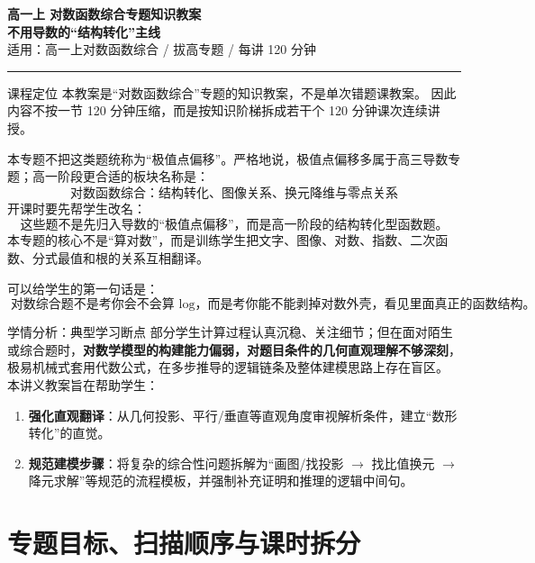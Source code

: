 \documentclass[11pt,a4paper]{ctexart}
\begin{document}
\begin{center}
  {\bfseries 高一上 \quad 对数函数综合专题知识教案}\\[3mm]
  {\Large \bfseries 不用导数的“结构转化”主线}\\[2mm]
  {\large 适用：高一上对数函数综合 / 拔高专题 / 每讲 120 分钟}\\[2mm]
  \rule{0.85\linewidth}{0.5pt}
\end{center}

\begin{teachbox}{课程定位}
本教案是“对数函数综合”专题的知识教案，不是单次错题课教案。
因此内容不按一节 120 分钟压缩，而是按知识阶梯拆成若干个 120 分钟课次连续讲授。

本专题不把这类题统称为“极值点偏移”。严格地说，极值点偏移多属于高三导数专题；高一阶段更合适的板块名称是：
\[
\boxed{\text{对数函数综合：结构转化、图像关系、换元降维与零点关系}}
\]
开课时要先帮学生改名：
\[
\boxed{\text{这些题不是先归入导数的“极值点偏移”，而是高一阶段的结构转化型函数题。}}
\]
本专题的核心不是“算对数”，而是训练学生把文字、图像、对数、指数、二次函数、分式最值和根的关系互相翻译。

可以给学生的第一句话是：
\[
\boxed{\text{对数综合题不是考你会不会算 }\log\text{，而是考你能不能剥掉对数外壳，看见里面真正的函数结构。}}
\]
\end{teachbox}

\begin{teachbox}{学情分析：典型学习断点}
部分学生计算过程认真沉稳、关注细节；但在面对陌生或综合题时，\textbf{对数学模型的构建能力偏弱，对题目条件的几何直观理解不够深刻}，极易机械式套用代数公式，在多步推导的逻辑链条及整体建模思路上存在盲区。
本讲义教案旨在帮助学生：
\begin{enumerate}
  \item \textbf{强化直观翻译}：从几何投影、平行/垂直等直观角度审视解析条件，建立“数形转化”的直觉。
  \item \textbf{规范建模步骤}：将复杂的综合性问题拆解为“画图/找投影 $\to$ 找比值换元 $\to$ 降元求解”等规范的流程模板，并强制补充证明和推理的逻辑中间句。
\end{enumerate}
\end{teachbox}

\section{专题目标、扫描顺序与课时拆分}
\end{document}
